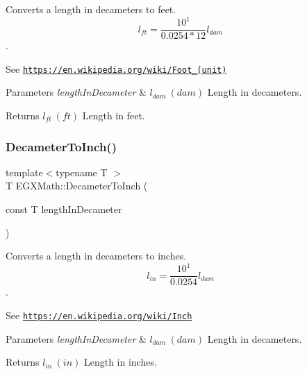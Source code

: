 Converts a length in decameters to feet. \[ l_{ft}= \frac{10^{1}}{0.0254 * 12} l_{dam} \]. 

See \href{https://en.wikipedia.org/wiki/Foot_(unit)}{\tt https\+://en.\+wikipedia.\+org/wiki/\+Foot\+\_\+(unit)} 
\begin{DoxyParams}{Parameters}
{\em length\+In\+Decameter} & $ l_{dam}\ (dam)$ Length in decameters. \\
\hline
\end{DoxyParams}
\begin{DoxyReturn}{Returns}
$ l_{ft}\ (ft)$ Length in feet. 
\end{DoxyReturn}
\mbox{\label{group___e_g_x_math-_conversions-_length_conversions-_s_i-_decameter-_imperial_ga246ab50e821640008d965b5690226df5}} 
\subsubsection{\texorpdfstring{Decameter\+To\+Inch()}{DecameterToInch()}}
{\footnotesize\ttfamily template$<$typename T $>$ \\
T E\+G\+X\+Math\+::\+Decameter\+To\+Inch (\begin{DoxyParamCaption}\item[{const T}]{length\+In\+Decameter }\end{DoxyParamCaption})}



Converts a length in decameters to inches. \[ l_{in}= \frac{10^{1}}{0.0254} l_{dam} \]. 

See \href{https://en.wikipedia.org/wiki/Inch}{\tt https\+://en.\+wikipedia.\+org/wiki/\+Inch} 
\begin{DoxyParams}{Parameters}
{\em length\+In\+Decameter} & $ l_{dam}\ (dam)$ Length in decameters. \\
\hline
\end{DoxyParams}
\begin{DoxyReturn}{Returns}
$ l_{in}\ (in)$ Length in inches. 
\end{DoxyReturn}
\mbox{\label{group___e_g_x_math-_conversions-_length_conversions-_s_i-_decameter-_imperial_gaee77251b6c2f2e8e0feae0032e80e0c3}} 
